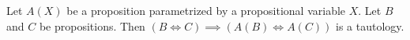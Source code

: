 \begin{node}\label{prop-000C}%
Let $A(X)$ be a proposition parametrized by a propositional variable $X$.
Let $B$ and $C$ be propositions. Then $(B\iff C)\implies(A(B)\iff A(C))$
is a tautology.
\end{node}
